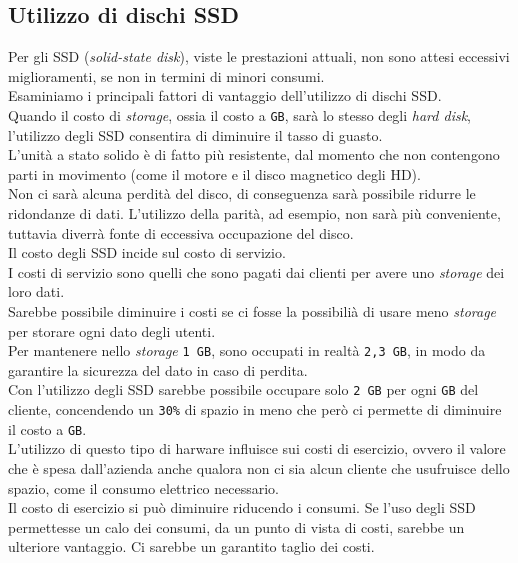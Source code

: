 \item
\subsection{Utilizzo di dischi SSD}
Per gli SSD (\textit{solid-state disk}), viste le prestazioni attuali, non sono attesi eccessivi miglioramenti, se non in termini di minori consumi.\\

Esaminiamo i principali fattori di vantaggio dell'utilizzo di dischi SSD.\\
Quando il costo di \textit{storage}, ossia il costo a \verb"GB", sar\`{a} lo stesso degli \textit{hard disk}, l'utilizzo degli SSD consentir{a} di diminuire il tasso di guasto.\\ 
L'unit\`{a} a stato solido \`{e} di fatto pi\`{u} resistente, dal momento che non contengono parti in movimento (come il motore e il disco magnetico degli HD).\\
Non ci sar\`{a} alcuna perdit\`{a} del disco, di conseguenza sar\`{a} possibile ridurre le ridondanze di dati. L'utilizzo della parit\`{a}, ad esempio, non sar\`{a} pi\`{u} conveniente, tuttavia diverr\`{a} fonte di eccessiva occupazione del disco. \\

Il costo degli SSD incide sul costo di servizio. \\
I costi di servizio sono quelli che sono pagati dai clienti per avere uno  \textit{storage} dei loro dati.\\
Sarebbe possibile diminuire i costi se ci fosse la possibili\`{a} di usare meno \textit{storage} per storare ogni dato degli utenti. \\
Per mantenere nello \textit{storage} \verb"1 GB", sono occupati in realt\`{a} \verb"2,3 GB", in modo da garantire la sicurezza del dato in caso di perdita. \\
Con l'utilizzo degli SSD sarebbe possibile occupare solo \verb"2 GB" per ogni \verb"GB" del cliente, concendendo un \verb"30%" di spazio in meno che per\`{o} ci permette di diminuire il costo a \verb"GB".\\

L'utilizzo di questo tipo di harware influisce sui costi di esercizio, ovvero il valore che \`{e} spesa dall'azienda anche qualora non ci sia alcun cliente che usufruisce dello spazio, come il consumo elettrico necessario.\\
Il costo di esercizio si pu\`{o} diminuire riducendo i consumi. Se l'uso degli SSD permettesse un calo dei consumi, da un punto di vista di costi, sarebbe un ulteriore vantaggio. Ci sarebbe un garantito taglio dei costi.\\

